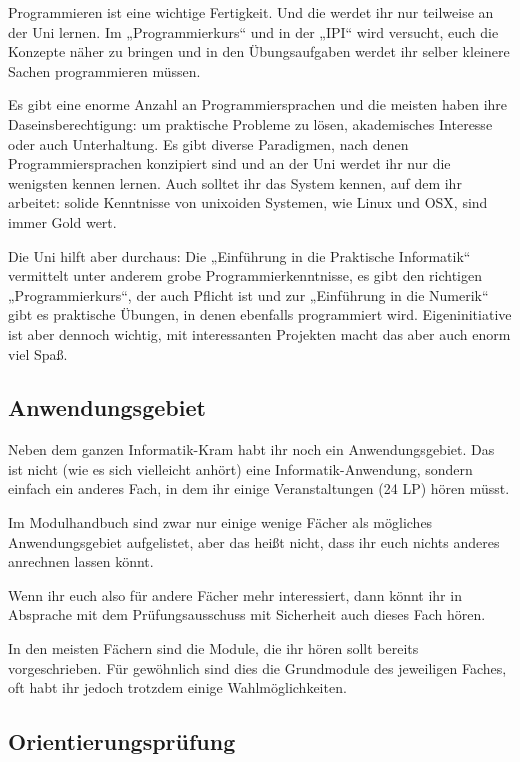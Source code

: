 Programmieren ist eine wichtige Fertigkeit. Und die werdet ihr nur teilweise an der Uni lernen. Im „Programmierkurs“ und in der „IPI“ wird versucht, euch die Konzepte näher zu bringen und in den Übungsaufgaben werdet ihr selber kleinere Sachen programmieren müssen.

Es gibt eine enorme Anzahl an Programmiersprachen und die meisten haben ihre Daseinsberechtigung: um praktische Probleme zu lösen, akademisches Interesse oder auch Unterhaltung. Es gibt diverse Paradigmen, nach denen Programmiersprachen konzipiert sind und an der Uni werdet ihr nur die wenigsten kennen lernen. Auch solltet ihr das System kennen, auf dem ihr arbeitet: solide Kenntnisse von unixoiden Systemen, wie Linux und OSX, sind immer Gold wert.

Die Uni hilft aber durchaus: Die „Einführung in die Praktische Informatik“ vermittelt unter anderem grobe Programmierkenntnisse, es gibt den richtigen „Programmierkurs“, der auch Pflicht ist und zur „Einführung in die Numerik“ gibt es praktische Übungen, in denen ebenfalls programmiert wird. Eigeninitiative ist aber dennoch wichtig, mit interessanten Projekten macht das aber auch enorm viel Spaß.


\subsection{Anwendungsgebiet}

Neben dem ganzen Informatik-Kram habt ihr noch ein Anwendungsgebiet. Das ist nicht (wie es sich vielleicht anhört) eine Informatik-Anwendung, sondern einfach ein anderes Fach, in dem ihr einige Veranstaltungen (24 \gls{LP}) hören müsst.

Im Modulhandbuch sind zwar nur einige wenige Fächer als mögliches Anwendungsgebiet aufgelistet, aber das heißt nicht, dass ihr euch nichts anderes anrechnen lassen könnt.

Wenn ihr euch also für andere Fächer mehr interessiert, dann könnt ihr in Absprache mit dem Prüfungsausschuss mit Sicherheit auch dieses Fach hören.

In den meisten Fächern sind die Module, die ihr hören sollt bereits vorgeschrieben. Für gewöhnlich sind dies die Grundmodule des jeweiligen Faches, oft habt ihr jedoch trotzdem einige Wahlmöglichkeiten.


\subsection{Orientierungsprüfung}

